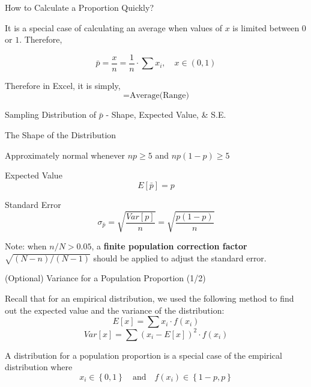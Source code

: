 \documentclass{beamer}
\begin{document}
\begin{frame}{How to Calculate a Proportion Quickly? }

It is a special case of calculating an average when values of $x$ is limited between $0$ or $1$. Therefore,

$$\bar{p} = \frac{x}{n} = \frac{1}{n} \cdot \sum x_i, \quad x\in(0, 1)$$

\vspace{0.3 cm}
Therefore in Excel, it is simply, 
$$ =\text{Average(Range)} $$

\end{frame}






\begin{frame}{Sampling Distribution of $\bar{p}$ - Shape, Expected Value, \& S.E.}

The Shape of the Distribution \\
\begin{center}
Approximately normal whenever $np\geq 5$ and $np(1-p) \geq 5$

\end{center}
Expected Value 
$$ E\left[ \bar{p} \right] = p$$

Standard Error
$$ \sigma_{\bar{p}} = \sqrt{\frac{Var \left[ p \right]}{n}} = \sqrt{\frac{p(1-p)}{n}}$$

Note: when $ n/N > 0.05 $, a \textbf{finite population correction factor} $\sqrt{(N-n)/(N-1)}$ should be applied to adjust the standard error.

\end{frame}



\begin{frame}{(Optional) Variance for a Population Proportion (1/2) }

Recall that for an empirical distribution, we used the following method to find out the expected value and the variance of the distribution: 
$$ E \left[x \right] = \sum x_i \cdot f(x_i) $$
$$ Var \left[x \right] = \sum (x_i - E \left[x \right])^2 \cdot f(x_i) $$

\vspace{0.3 cm}
A distribution for a population proportion is a special case of the empirical distribution where 
$$ x_i \in \left\lbrace 0, 1  \right\rbrace \quad \text{and} \quad f(x_i) \in \left\lbrace 1 - p, p  \right\rbrace$$

\end{frame}
\end{document}
